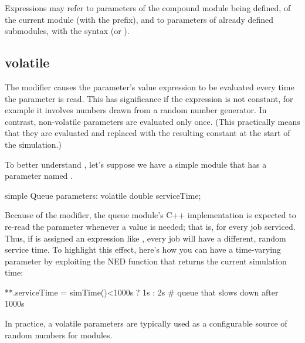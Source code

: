 
Expressions may refer to parameters of the compound module being defined,
of the current module (with the  prefix), and to parameters
of already defined submodules, with the syntax 
(or ).




\subsection{volatile}
\label{sec:ned-lang:volatile}

The  modifier causes the parameter's value expression to
be evaluated every time the parameter is read. This has significance if the
expression is not constant, for example it involves numbers drawn from a
random number generator. In contrast, non-volatile parameters are evaluated
only once. (This practically means that they are evaluated and replaced
with the resulting constant at the start of the simulation.)

To better understand , let's suppose we have a
 simple module that has a  parameter
named .

\begin{ned}
simple Queue
{
    parameters:
        volatile double serviceTime;
}
\end{ned}

Because of the  modifier, the queue module's C++
implementation is expected to re-read the  parameter
whenever a value is needed; that is, for every job serviced. Thus, if
 is assigned an expression like ,
every job will have a different, random service time. To highlight this
effect, here's how you can have a time-varying parameter by exploiting
the  NED function that returns the current simulation time:

\begin{inifile}
**.serviceTime = simTime()<1000s ? 1s : 2s  # queue that slows down after 1000s
\end{inifile}

In practice, a volatile parameters are typically used as a configurable
source of random numbers for modules.

